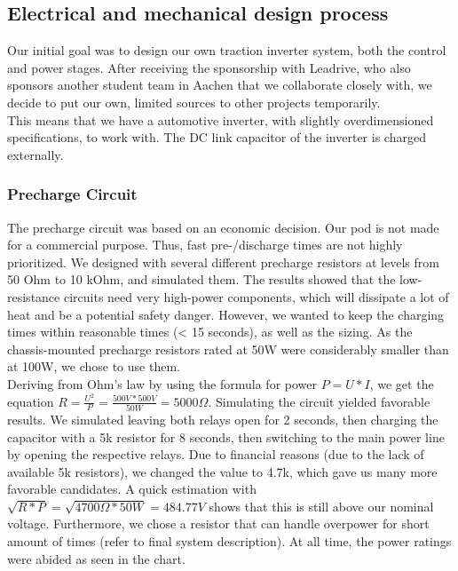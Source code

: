 \subsection{Electrical and mechanical design process}
Our initial goal was to design our own traction inverter system, both the control and power stages. 
After receiving the sponsorship with 
Leadrive, who also sponsors another student team
in Aachen that we collaborate closely with,
we decide to put our own, limited sources to other
projects temporarily. \\
This means that we have a automotive inverter,
with slightly overdimensioned specifications,
to work with. The DC link capacitor of the inverter is charged externally. \\
\subsubsection*{Precharge Circuit}
The precharge circuit was based on an economic decision. Our pod is not made for a commercial purpose. Thus, fast pre-/discharge times are not highly prioritized. We designed with several different precharge resistors at levels from 50 Ohm to 10 kOhm, and simulated them. The results showed that the low-resistance circuits need very high-power components, which will dissipate a lot of heat and be a potential safety danger. However, we wanted to keep the charging times within reasonable times (< 15 seconds), as well as the sizing. As the chassis-mounted precharge resistors rated at 50W were considerably smaller than at 100W, we chose to use them. \\
Deriving from Ohm's law by using the formula for power \(P = U*I\), we get the equation \(R = \frac{U^2}{P} = \frac{500V*500V}{50W} = 5000 \Omega \). Simulating the circuit yielded favorable results. We simulated leaving both relays open for 2 seconds, then charging the capacitor with a 5k resistor for 8 seconds, then switching to the main power line by opening the respective relays. Due to financial reasons (due to the lack of available 5k resistors), we changed the value to 4.7k, which gave us many more favorable candidates. A quick estimation with \(\sqrt{R*P} = \sqrt{4700\Omega*50W} = 484.77V\) shows that this is still above our nominal voltage. Furthermore, we chose a resistor that can handle overpower for short amount of times (refer to final system description).  At all time, the power ratings were abided as seen in the chart.  \\
